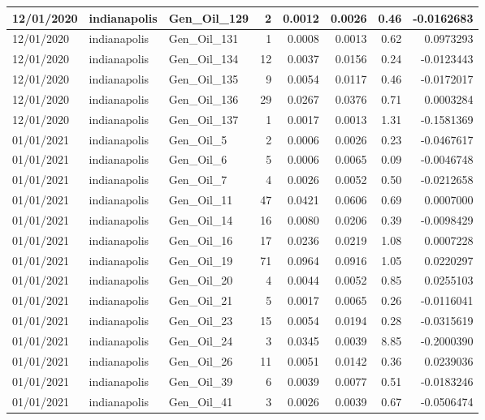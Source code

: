 \documentclass[
  letterpaper,
  DIV=11,
  numbers=noendperiod]{scrartcl}
\begin{document}
\begin{tabular}{l|l|l|r|r|r|r|r}
\hline
12/01/2020 & indianapolis & Gen\_Oil\_129 & 2 & 0.0012 & 0.0026 & 0.46 & -0.0162683\\
\hline
12/01/2020 & indianapolis & Gen\_Oil\_131 & 1 & 0.0008 & 0.0013 & 0.62 & 0.0973293\\
\hline
12/01/2020 & indianapolis & Gen\_Oil\_134 & 12 & 0.0037 & 0.0156 & 0.24 & -0.0123443\\
\hline
12/01/2020 & indianapolis & Gen\_Oil\_135 & 9 & 0.0054 & 0.0117 & 0.46 & -0.0172017\\
\hline
12/01/2020 & indianapolis & Gen\_Oil\_136 & 29 & 0.0267 & 0.0376 & 0.71 & 0.0003284\\
\hline
12/01/2020 & indianapolis & Gen\_Oil\_137 & 1 & 0.0017 & 0.0013 & 1.31 & -0.1581369\\
\hline
01/01/2021 & indianapolis & Gen\_Oil\_5 & 2 & 0.0006 & 0.0026 & 0.23 & -0.0467617\\
\hline
01/01/2021 & indianapolis & Gen\_Oil\_6 & 5 & 0.0006 & 0.0065 & 0.09 & -0.0046748\\
\hline
01/01/2021 & indianapolis & Gen\_Oil\_7 & 4 & 0.0026 & 0.0052 & 0.50 & -0.0212658\\
\hline
01/01/2021 & indianapolis & Gen\_Oil\_11 & 47 & 0.0421 & 0.0606 & 0.69 & 0.0007000\\
\hline
01/01/2021 & indianapolis & Gen\_Oil\_14 & 16 & 0.0080 & 0.0206 & 0.39 & -0.0098429\\
\hline
01/01/2021 & indianapolis & Gen\_Oil\_16 & 17 & 0.0236 & 0.0219 & 1.08 & 0.0007228\\
\hline
01/01/2021 & indianapolis & Gen\_Oil\_19 & 71 & 0.0964 & 0.0916 & 1.05 & 0.0220297\\
\hline
01/01/2021 & indianapolis & Gen\_Oil\_20 & 4 & 0.0044 & 0.0052 & 0.85 & 0.0255103\\
\hline
01/01/2021 & indianapolis & Gen\_Oil\_21 & 5 & 0.0017 & 0.0065 & 0.26 & -0.0116041\\
\hline
01/01/2021 & indianapolis & Gen\_Oil\_23 & 15 & 0.0054 & 0.0194 & 0.28 & -0.0315619\\
\hline
01/01/2021 & indianapolis & Gen\_Oil\_24 & 3 & 0.0345 & 0.0039 & 8.85 & -0.2000390\\
\hline
01/01/2021 & indianapolis & Gen\_Oil\_26 & 11 & 0.0051 & 0.0142 & 0.36 & 0.0239036\\
\hline
01/01/2021 & indianapolis & Gen\_Oil\_39 & 6 & 0.0039 & 0.0077 & 0.51 & -0.0183246\\
\hline
01/01/2021 & indianapolis & Gen\_Oil\_41 & 3 & 0.0026 & 0.0039 & 0.67 & -0.0506474\\

\end{tabular}
\end{document}
